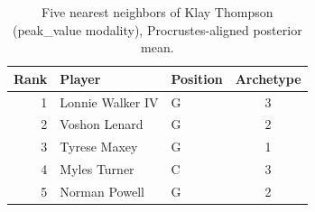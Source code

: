 \begin{table}[htbp]
  \centering\small
  \begin{tabular}{rllc}
    \toprule
    Rank & Player & Position & Archetype \\
    \midrule
    1 & Lonnie Walker IV & G & 3 \\
    2 & Voshon Lenard & G & 2 \\
    3 & Tyrese Maxey & G & 1 \\
    4 & Myles Turner & C & 3 \\
    5 & Norman Powell & G & 2 \\
    \bottomrule
  \end{tabular}
  \caption{Five nearest neighbors of Klay Thompson (peak_value modality), Procrustes-aligned posterior mean.}
  \label{tab:Klay_Thompson_neighbors_peak_value}
\end{table}

